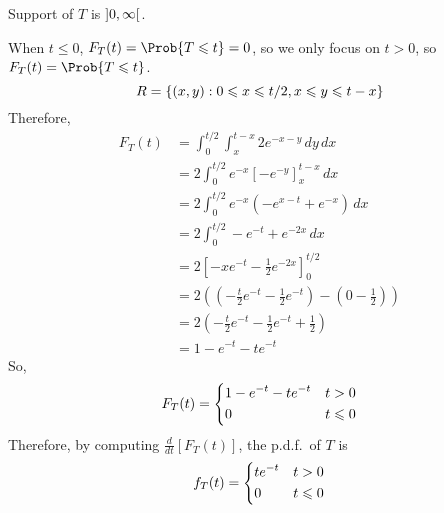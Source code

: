 \begin{Example}{}{}
\begin{enumerate}[label=(\roman*)]
              Support of $ T $ is $ \interval[open]{0}{\infty} $.

              When $ t\leqslant 0 $, $ F_T(t)=\Prob{T\leqslant t}=0 $,
              so we only focus on $ t>0 $, so $ F_T(t)=\Prob{T\leqslant t} $.
              \[ R=\{(x,y):0\leqslant x\leqslant t/2, x\leqslant y\leqslant t-x\} \]
              Therefore,
              \begin{align*}
                  F_T(t)
                   & = \int_{0}^{t/2} \int_{x}^{t-x} 2e^{-x-y}\, d{y} \, d{x}             \\
                   & =2 \int_{0}^{t/2} e^{-x}\left[ -e^{-y} \right]_x^{t-x}\, d{x}        \\
                   & =2 \int_{0}^{t/2} e^{-x}\left( -e^{x-t}+e^{-x} \right)\, d{x}        \\
                   & =2 \int_{0}^{t/2} -e^{-t}+e^{-2x}\, d{x}                             \\
                   & =2\left[ -xe^{-t}-\frac{1}{2}e^{-2x} \right]_0^{t/2}                 \\
                   & =2\left( \left( -\frac{t}{2} e^{-t} -\frac{1}{2} e^{-t}\right)
                  -\left( 0-\frac{1}{2}  \right) \right)                                  \\
                   & =2\left( -\frac{t}{2} e^{-t}-\frac{1}{2} e^{-t}+\frac{1}{2}  \right) \\
                   & =1-e^{-t}-te^{-t}
              \end{align*}
              So,
              \[ F_T(t)=
                  \begin{dcases}
                      1-e^{-t}-te^{-t} & t>0          \\
                      0                & t\leqslant 0
                  \end{dcases} \]
              Therefore, by computing $ \displaystyle
                  \frac{d}{dt}[F_T(t)] $, the p.d.f.\ of $ T $ is
              \[ f_T(t)=
                  \begin{dcases}
                      te^{-t} & t> 0         \\
                      0       & t\leqslant 0
                  \end{dcases} \]
    \end{enumerate}
\end{Example}
